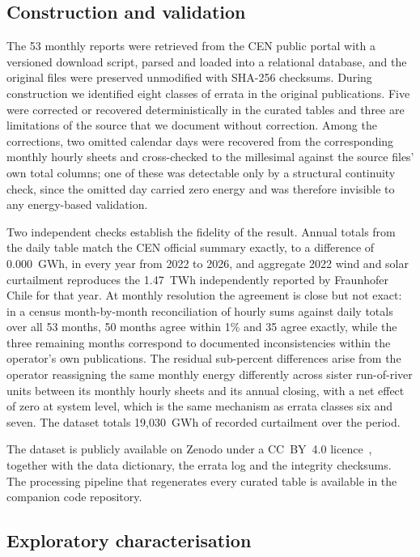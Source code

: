 \documentclass[preprint,3p,times]{elsarticle}
\providecommand{\DIFaddbegin}{} %
\providecommand{\DIFaddend}{} %
\begin{document}
\subsection{Construction and validation}

The 53 monthly reports were retrieved from the CEN public portal with a versioned download script, parsed and loaded into a relational database, and the original files were preserved unmodified with SHA-256 checksums. During construction we identified eight classes of errata in the original publications. Five were corrected or recovered deterministically in the curated tables and three are limitations of the source that we document without correction. Among the corrections, two omitted calendar days were recovered from the corresponding monthly hourly sheets and cross-checked to the millesimal against the source files' own total columns; one of these was detectable only by a structural continuity check, since the omitted day carried zero energy and was therefore invisible to any energy-based validation.

Two independent checks establish the fidelity of the result. Annual totals from the daily table match the CEN official summary exactly, to a difference of 0.000~GWh, in every year from 2022 to 2026, and aggregate 2022 wind and solar curtailment reproduces the 1.47~TWh independently reported by Fraunhofer Chile for that year. At monthly resolution the agreement is close but not exact: in a census month-by-month reconciliation of hourly sums against daily totals over all 53 months, 50 months agree within 1\% and 35 agree exactly, while the three remaining months correspond to documented inconsistencies within the operator's own publications. The residual sub-percent differences arise from the operator reassigning the same monthly energy differently across sister run-of-river units between its monthly hourly sheets and its annual closing, with a net effect of zero at system level, which is the same mechanism as errata classes six and seven. The dataset totals 19{,}030~GWh of recorded curtailment over the period.

The dataset is publicly available on Zenodo under a CC~BY~4.0 licence~\cite{dataset2026}, together with the data dictionary, the errata log and the integrity checksums. The processing pipeline that regenerates every curated table is available in the companion code repository.

\subsection{Exploratory characterisation}
\DIFaddbegin \label{sec:eda}
\DIFaddend 
\end{document}
